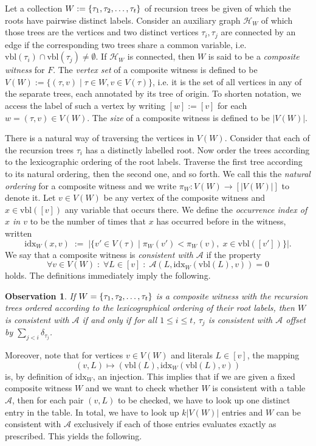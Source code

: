 \documentclass[11pt,a4paper]{article}
\newtheorem{observation}[theorem]{Observation}
\newcommand{\prbl}{\vspace*{0.2cm}}
\begin{document}
Let a collection $W := \{\tau_1, \tau_2, \mathellipsis, \tau_t\}$ of recursion trees be given of which
the roots have pairwise distinct labels.
Consider an auxiliary graph $\mathcal{H}_W$ of which those trees are the vertices and two distinct vertices
$\tau_i, \tau_j$
are connected by an edge if the corresponding two trees share a common variable,
i.e. $\mbox{vbl}(\tau_i) \cap \mbox{vbl}(\tau_j) \ne \emptyset$. If $\mathcal{H}_W$ is connected,
then $W$ is said to be a \emph{composite witness} for $F$. The \emph{vertex set} of a composite witness
is defined to be $V(W) := \{(\tau,v) \; | \; \tau \in W, v \in V(\tau)\}$, i.e. it is the set of all vertices in
any of the separate trees, each annotated by its tree of origin. To shorten notation, we access the label
of such a vertex by writing $[w] := [v]$ for each $w=(\tau,v)\in V(W)$. The \emph{size} of a composite witness 
is defined to be $|V(W)|$.

There is a natural way of traversing the vertices in $V(W)$. Consider that each of the recursion
trees $\tau_i$ has a distinctly labelled root. Now order the trees according to the lexicographic ordering
of the root labels. Traverse the first tree according to its natural ordering, then the second one, and
so forth. We call this the \emph{natural ordering} for a composite witness and we write 
$\pi_W : V(W) \rightarrow [|V(W)|]$ to denote it. Let $v \in V(W)$ be any vertex of the composite
witness and $x \in \mbox{vbl}([v])$ any variable that occurs there. We define the
\emph{occurrence index of $x$ in $v$} to be the number of times that $x$ has occurred before in
the witness, written
$$ \mbox{idx}_W(x,v) \; := \; | \{ v' \in V(\tau) \; | \;  
\pi_W(v') < \pi_W(v), \; x \in \mbox{vbl}([v'])  \} |. $$
We say that a composite witness is \emph{consistent with $\mathcal{A}$} if the property
$$ \forall v \in V(W) \; : \; \forall L \in [v] \; : \; \mathcal{A}(L, \mbox{idx}_W(\mbox{vbl}(L), v)) = 0$$
holds. The definitions immediately imply the following.

\begin{observation}
\label{obsoffsetcons}
If $W = \{\tau_1, \tau_2, \mathellipsis, \tau_t\}$ is a composite witness with the recursion
trees ordered according to the lexicographical ordering of their root labels, then $W$ is consistent
with $\mathcal{A}$ if and only if for all $1 \le i \le t$, $\tau_j$ is consistent with $\mathcal{A}$ offset
by $\sum_{j<i} \delta_{\tau_j}$.
\end{observation}
\prbl

Moreover, note that for vertices $v \in V(W)$ and literals $L \in [v]$, the mapping
$$(v,L) \mapsto (\mbox{vbl}(L), \mbox{idx}_W(\mbox{vbl}(L),v))$$ is, by definition of $\mbox{idx}_W$,  an injection. This implies
that if we are given a fixed composite witness $W$ and we want to check whether $W$ is consistent with
a table $\mathcal{A}$, then for each pair $(v,L)$ to be checked, we have to look up one distinct entry
in the table. In total, we have to look up $k|V(W)|$ entries and $W$ can be consistent with $\mathcal{A}$
exclusively if each of those entries evaluates exactly as prescribed. This yields the following.
\end{document}
